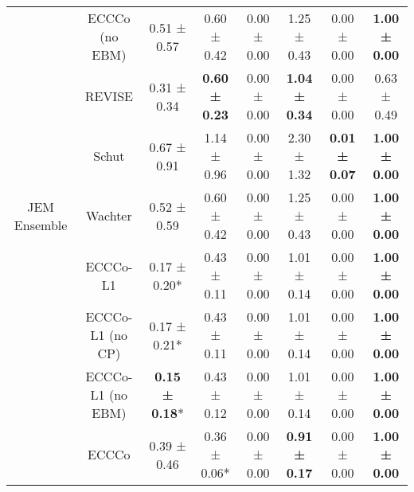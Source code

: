 \begin{table}
{\begin{tabular}[t]{cccccccc}
 & ECCCo (no EBM) & 0.51 ± 0.57\hphantom{*}\hphantom{*} & 0.60 ± 0.42\hphantom{*}\hphantom{*} & 0.00 ± 0.00\hphantom{*}\hphantom{*} & 1.25 ± 0.43\hphantom{*}\hphantom{*} & 0.00 ± 0.00\hphantom{*}\hphantom{*} & \textbf{1.00 ± 0.00}\hphantom{*}\hphantom{*}\\

 & REVISE & 0.31 ± 0.34\hphantom{*}\hphantom{*} & \textbf{0.60 ± 0.23}\hphantom{*}\hphantom{*} & 0.00 ± 0.00\hphantom{*}\hphantom{*} & \textbf{1.04 ± 0.34}\hphantom{*}\hphantom{*} & 0.00 ± 0.00\hphantom{*}\hphantom{*} & 0.63 ± 0.49\hphantom{*}\hphantom{*}\\

 & Schut & 0.67 ± 0.91\hphantom{*}\hphantom{*} & 1.14 ± 0.96\hphantom{*}\hphantom{*} & 0.00 ± 0.00\hphantom{*}\hphantom{*} & 2.30 ± 1.32\hphantom{*}\hphantom{*} & \textbf{0.01 ± 0.07}\hphantom{*}\hphantom{*} & \textbf{1.00 ± 0.00}\hphantom{*}\hphantom{*}\\

\multirow[t]{-9}{*}{\centering\arraybackslash JEM Ensemble} & Wachter & 0.52 ± 0.59\hphantom{*}\hphantom{*} & 0.60 ± 0.42\hphantom{*}\hphantom{*} & 0.00 ± 0.00\hphantom{*}\hphantom{*} & 1.25 ± 0.43\hphantom{*}\hphantom{*} & 0.00 ± 0.00\hphantom{*}\hphantom{*} & \textbf{1.00 ± 0.00}\hphantom{*}\hphantom{*}\\
\cmidrule{1-8}
 & ECCCo-L1 & 0.17 ± 0.20*\hphantom{*} & 0.43 ± 0.11\hphantom{*}\hphantom{*} & 0.00 ± 0.00\hphantom{*}\hphantom{*} & 1.01 ± 0.14\hphantom{*}\hphantom{*} & 0.00 ± 0.00\hphantom{*}\hphantom{*} & \textbf{1.00 ± 0.00}\hphantom{*}\hphantom{*}\\

 & ECCCo-L1 (no CP) & 0.17 ± 0.21*\hphantom{*} & 0.43 ± 0.11\hphantom{*}\hphantom{*} & 0.00 ± 0.00\hphantom{*}\hphantom{*} & 1.01 ± 0.14\hphantom{*}\hphantom{*} & 0.00 ± 0.00\hphantom{*}\hphantom{*} & \textbf{1.00 ± 0.00}\hphantom{*}\hphantom{*}\\

 & ECCCo-L1 (no EBM) & \textbf{0.15 ± 0.18}*\hphantom{*} & 0.43 ± 0.12\hphantom{*}\hphantom{*} & 0.00 ± 0.00\hphantom{*}\hphantom{*} & 1.01 ± 0.14\hphantom{*}\hphantom{*} & 0.00 ± 0.00\hphantom{*}\hphantom{*} & \textbf{1.00 ± 0.00}\hphantom{*}\hphantom{*}\\

 & ECCCo & 0.39 ± 0.46\hphantom{*}\hphantom{*} & 0.36 ± 0.06*\hphantom{*} & 0.00 ± 0.00\hphantom{*}\hphantom{*} & \textbf{0.91 ± 0.17}\hphantom{*}\hphantom{*} & 0.00 ± 0.00\hphantom{*}\hphantom{*} & \textbf{1.00 ± 0.00}\hphantom{*}\hphantom{*}\\


\end{tabular}}
\end{table}
